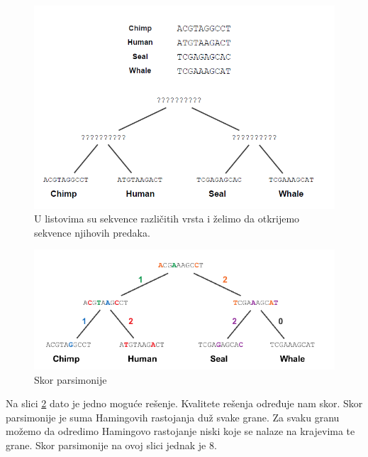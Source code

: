 \begin{minipage}{\textwidth}
	\centering
	\begin{minipage}{0.45\textwidth}
		\begin{figure}[H]
			\centering
			\includegraphics[width=\textwidth]{poglavlja/7/slike/malaParsemonija.png}
			\caption{U listovima su sekvence različitih vrsta i želimo da otkrijemo sekvence njihovih predaka.}
			\label{slika:malaParsimonija}
		\end{figure} 
	\end{minipage}
	\hfill 
	\begin{minipage}{0.45\textwidth}
		\begin{figure}[H]
			\centering
			\includegraphics[width=\textwidth]{poglavlja/7/slike/malaParsemonija2.png}
			\caption{Skor parsimonije}
			\label{slika:malaParsimonijaSkor}
		\end{figure}  
	\end{minipage}
	\vspace*{1em}
\end{minipage}

Na slici \ref{slika:malaParsimonijaSkor} dato je jedno moguće rešenje. Kvalitete rešenja određuje nam skor. Skor parsimonije je suma Hamingovih rastojanja du\v{z} svake grane. Za svaku granu možemo da odredimo Hamingovo rastojanje niski koje se nalaze na krajevima te grane. Skor parsimonije na ovoj slici jednak je 8.

